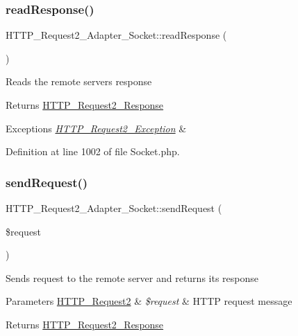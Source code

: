 \subsubsection{\texorpdfstring{read\+Response()}{readResponse()}}
{\footnotesize\ttfamily H\+T\+T\+P\+\_\+\+Request2\+\_\+\+Adapter\+\_\+\+Socket\+::read\+Response (\begin{DoxyParamCaption}{ }\end{DoxyParamCaption})\hspace{0.3cm}{\ttfamily [protected]}}

Reads the remote server\textquotesingle{}s response

\begin{DoxyReturn}{Returns}
\hyperlink{classHTTP__Request2__Response}{H\+T\+T\+P\+\_\+\+Request2\+\_\+\+Response} 
\end{DoxyReturn}

\begin{DoxyExceptions}{Exceptions}
{\em \hyperlink{classHTTP__Request2__Exception}{H\+T\+T\+P\+\_\+\+Request2\+\_\+\+Exception}} & \\
\hline
\end{DoxyExceptions}


Definition at line 1002 of file Socket.\+php.

\mbox{\label{classHTTP__Request2__Adapter__Socket_ac601f7f165d0771e38f680a1f159fe79}} 
\subsubsection{\texorpdfstring{send\+Request()}{sendRequest()}}
{\footnotesize\ttfamily H\+T\+T\+P\+\_\+\+Request2\+\_\+\+Adapter\+\_\+\+Socket\+::send\+Request (\begin{DoxyParamCaption}\item[{\hyperlink{classHTTP__Request2}{H\+T\+T\+P\+\_\+\+Request2}}]{\$request }\end{DoxyParamCaption})}

Sends request to the remote server and returns its response


\begin{DoxyParams}[1]{Parameters}
\hyperlink{classHTTP__Request2}{H\+T\+T\+P\+\_\+\+Request2} & {\em \$request} & H\+T\+TP request message\\
\hline
\end{DoxyParams}
\begin{DoxyReturn}{Returns}
\hyperlink{classHTTP__Request2__Response}{H\+T\+T\+P\+\_\+\+Request2\+\_\+\+Response} 
\end{DoxyReturn}

